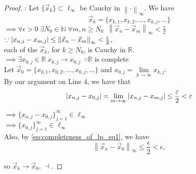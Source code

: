 \documentclass[notoc,notitlepage]{tufte-book}
\newcommand{\norm}[1]{\left\| #1 \right\|}
\begin{document}
\begin{proof}
  : Let $\{ \vec{x}_k \} \subset \ell_\infty$ be Cauchy in $\norm\cdot_\infty$. We have
  \begin{equation*}
    \vec{x}_k = \{ x_{k, 1}, x_{k, 2}, \ldots, x_{k, j}, \ldots \}
  \end{equation*}
  $\implies \forall \epsilon > 0 \; \exists N_0 \in \mathbb{N} \; \forall m, n \geq N_0 \enspace \norm{\vec{x}_n - \vec{x}_m}_\infty < \frac{\epsilon}{2}$ \\
  $\because \abs{ x_{n, j} - x_{m, j} } \leq \norm{\vec{x}_n - \vec{x}_m}_\infty < \frac{\epsilon}{2}$,\\
  each of the $\vec{x}_k$, for $k \geq N_0$, is Cauchy in $\mathbb{R}$. \\
  $\implies \exists x_{0, j} \in \mathbb{R} \; x_{k, j} \to x_{0, j} \enspace \because \mathbb{R}$ is complete \\
  Let $\vec{x}_0 = \{ x_{0, 1}, x_{0, 2}, \ldots, x_{0, j}, \ldots \}$ and $x_{0, j} = \lim\limits_{k \to \infty} x_{k, j}$. \\ By our argument on Line 4, we have that
  \begin{equation}\label{eq:completeness_of_lp_eq1}
    \left|x_{n, j} - x_{0, j}\right| = \lim_{m \to \infty} \left| x_{n, j} - x_{m, j} \right| \leq \frac{\varepsilon}{2} < \varepsilon
  \end{equation}

  $\implies \{ x_{n, j} - x_{0, j} \}_{j = 1}^{\infty} \in \ell_\infty$ \\
  $\implies \{ x_{0, j} \}_{j = 1}^{\infty} \in \ell_\infty$ \\
  Also, by \cref{eq:completeness_of_lp_eq1}, we have
  \begin{equation*}
    \norm{\vec{x}_n - \vec{x}_0}_\infty \leq \frac{\epsilon}{2} < \epsilon,
  \end{equation*}

  so $\vec{x}_k \to \vec{x}_0$. $\dashv$.


\end{proof}
\end{document}
